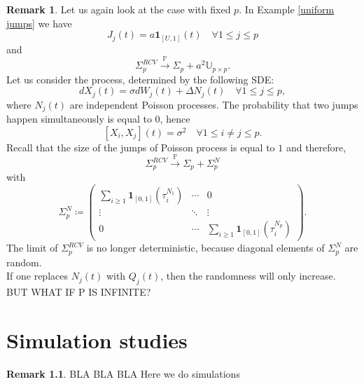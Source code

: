 \documentclass[a4paper,11pt]{book}
\theoremstyle{plain}
\theoremstyle{definition}
\newtheorem{rmrk}[thm]{Remark}
\newcommand{\MP}{\mathbb{P}}
\begin{document}
    \begin{rmrk}
    	Let us again look at the case with fixed $p$. In Example \ref{uniform jumps} we have
    	\[J_j(t) = a\mathbf{1}_{[U, 1]}(t) \quad \forall 1 \leq j \leq p \]
    	and
    	\[ \Sigma_p^{RCV} \xrightarrow{\MP} \Sigma_p + a^2\mathbb{U}_{p \times p}.  \]    	
    	Let us consider the process, determined by the following SDE:
    	\[ dX_j(t) = \sigma dW_j(t) + \Delta N_j(t) \quad \forall 1 \leq j \leq p, \]
    	where $N_j(t)$ are independent Poisson processes. The probability that two jumps happen simultaneously is equal to $0$, hence
    	\[ [X_i, X_j](t) = \sigma^2 \quad \forall 1 \leq i \neq j \leq p. \]
    	Recall that the size of the jumps of Poisson process is equal to $1$ and therefore,
    	\[ \Sigma_p^{RCV} \xrightarrow{\MP} \Sigma_p + \Sigma_p^N\]
    	with
    	\[
    	 \Sigma_p^N \coloneqq \begin{pmatrix}
    	\sum_{i \geq 1} \mathbf{1}_{[0, 1]} (\tau_i^{N_1}) & \cdots & 0 \\
    	\vdots & \ddots & \vdots \\
    	0 & \cdots & \sum_{i \geq 1} \mathbf{1}_{[0, 1]} (\tau_i^{N_p})
    	\end{pmatrix}
    	. \]
    	The limit of $\Sigma_p^{RCV}$ is no longer deterministic, because diagonal elements of $\Sigma_p^N$ are random. \\
    	If one replaces $N_j(t)$ with $Q_j(t)$, then the randomness will only increase.
    	BUT WHAT IF P IS INFINITE?
    \end{rmrk}
    
    \chapter{Simulation studies}
    
    \begin{rmrk}
    	BLA BLA BLA Here we do simulations
    \end{rmrk}
    
\end{document}
